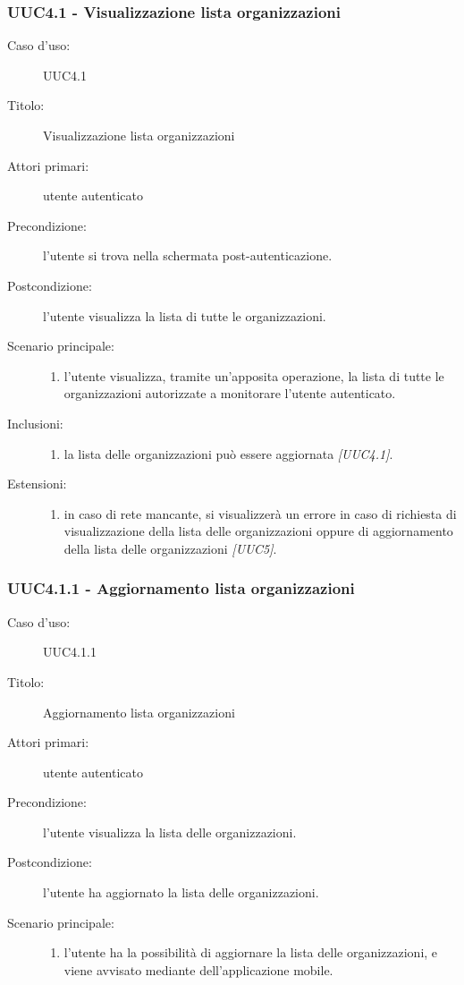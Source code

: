 \documentclass[../../../analisi-dei-requisiti.tex]{subfiles}
\begin{document}
\subsubsection{UUC4.1 - Visualizzazione lista organizzazioni}%
\label{subsub:UUC4.1utente}
\begin{description}
  \item[Caso d’uso:] UUC4.1
  \item[Titolo:] Visualizzazione lista organizzazioni
  \item[Attori primari:] utente autenticato
  \item[Precondizione:] l'utente si trova nella schermata post-autenticazione.
  \item[Postcondizione:] l'utente visualizza la lista di tutte le organizzazioni.
  \item[Scenario principale:]
        \begin{enumerate}
          \item l'utente visualizza, tramite un'apposita operazione, la lista di tutte le organizzazioni autorizzate a monitorare l'utente autenticato.
        \end{enumerate}
  \item[Inclusioni:]
        \begin{enumerate}
          \item la lista delle organizzazioni può essere aggiornata \emph{[UUC4.1]}.
        \end{enumerate}
  \item[Estensioni:]
        \begin{enumerate}
          \item in caso di rete mancante, si visualizzerà un errore in caso di richiesta di visualizzazione della lista delle organizzazioni
                oppure di aggiornamento della lista delle organizzazioni \emph{[UUC5]}.
        \end{enumerate}
\end{description}

\subsubsection{UUC4.1.1 - Aggiornamento lista organizzazioni}%
\label{subsub:UUC4.1.1utente}
\begin{description}
  \item[Caso d’uso:] UUC4.1.1
  \item[Titolo:] Aggiornamento lista organizzazioni
  \item[Attori primari:] utente autenticato
  \item[Precondizione:] l'utente visualizza la lista delle organizzazioni.
  \item[Postcondizione:] l'utente ha aggiornato la lista delle organizzazioni.
  \item[Scenario principale:]
        \begin{enumerate}
          \item l'utente ha la possibilità di aggiornare la lista delle organizzazioni, e viene avvisato mediante  dell'applicazione mobile.
        \end{enumerate}
\end{description}
\end{document}
